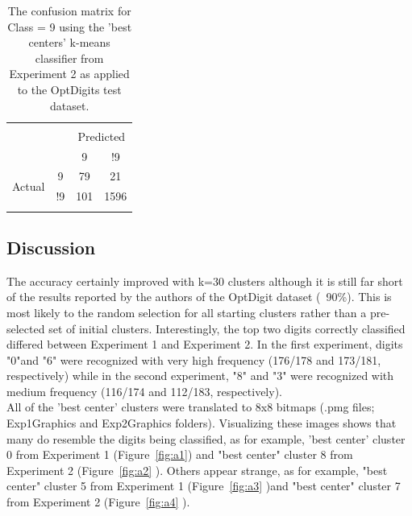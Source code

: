 \documentclass[12pt]{article}
\begin{document}
\begin{table}[!htbp] \centering 
  \caption{The confusion matrix for Class = 9 using the 'best centers' k-means classifier from Experiment 2 as applied to the OptDigits test dataset.} 
  \label{tab:b12} 
\begin{tabular}{lccc} 
\\[-1.8ex]\hline 
\hline \\[-1.8ex] 
\multicolumn{2}{c}{} & \multicolumn{2}{c}{Predicted} \\
\multicolumn{2}{c}{} & 9 & !9\\
\multirow{2}{*}{Actual} & 9 & 79 & 21\\
& !9 & 101 & 1596\\
\hline \\[-1.8ex]
\end{tabular} 
\end{table}

\subsection{Discussion}
The accuracy certainly improved with k=30 clusters although it is still far short of the results reported by the authors of the OptDigit dataset (~90\%). This is most likely to the random selection for all starting clusters rather than a pre-selected set of initial clusters. Interestingly, the top two digits correctly classified differed between Experiment 1 and Experiment 2. In the first experiment, digits "0"and "6" were recognized with very high frequency (176/178 and 173/181, respectively) while in the second experiment, "8" and "3" were recognized with medium frequency (116/174 and 112/183, respectively).\\

All of the 'best center' clusters were translated to 8x8 bitmaps (.pmg files; Exp1Graphics and Exp2Graphics folders). Visualizing these images shows that many do resemble the digits being classified, as for example, 'best center' cluster 0 from Experiment 1 (Figure~\ref{fig:a1}) and "best center" cluster 8 from Experiment 2 (Figure~\ref{fig:a2} ). Others appear strange, as for example, "best center" cluster 5 from Experiment 1 (Figure~\ref{fig:a3} )and "best center" cluster 7 from Experiment 2 (Figure~\ref{fig:a4} ).
\end{document}

